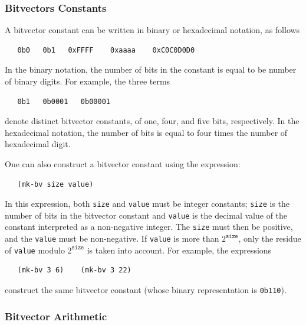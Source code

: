 \documentclass[11pt,twoside,fleqn,openright,titlepage]{cslreport}
\begin{document}
\subsubsection*{Bitvectors Constants}

A bitvector constant can be written in binary or hexadecimal notation, as follows
\begin{small}
\begin{verbatim}
   0b0   0b1   0xFFFF    0xaaaa    0xC0C0D0D0
\end{verbatim}
\end{small}
In the binary notation, the number of bits in the constant is equal to
be number of binary digits. For example, the three terms
\begin{small}
\begin{verbatim}
   0b1   0b0001   0b00001
\end{verbatim}
\end{small}
denote distinct bitvector constants, of one, four, and five bits, respectively.
In the hexadecimal notation, the number of bits is equal to four times the number
of hexadecimal digit.

\medskip\noindent
One can also construct a bitvector constant using the expression:
\begin{small}
\begin{verbatim}
   (mk-bv size value)
\end{verbatim}
\end{small}
In this expression, both \texttt{size} and \texttt{value} must be
integer constants; \texttt{size} is the number of bits in the
bitvector constant and \texttt{value} is the decimal value of the
constant interpreted as a non-negative integer. The \texttt{size}
must then be positive, and the \texttt{value} must be
non-negative. If \texttt{value} is more than $2^{\mathtt{size}}$,
only the residue of \texttt{value} modulo $2^{\mathtt{size}}$ is
taken into account. For example, the expressions
\begin{small}
\begin{verbatim}
   (mk-bv 3 6)    (mk-bv 3 22)
\end{verbatim}
\end{small}
construct the same bitvector constant (whose binary representation is
\texttt{0b110}).

\subsubsection*{Bitvector Arithmetic}
\end{document}

